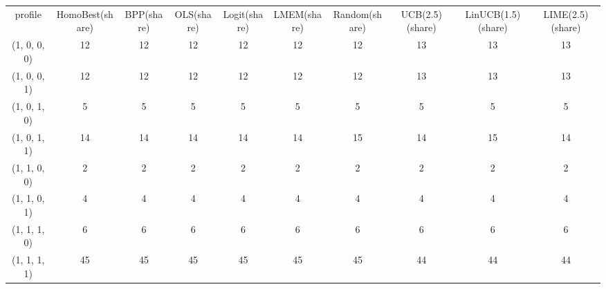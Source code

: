 \begin{tabular}{cccccccccc}
profile & HomoBest(share) & BPP(share) & OLS(share) & Logit(share) & LMEM(share) & Random(share) & UCB(2.5)(share) & LinUCB(1.5)(share) & LIME(2.5)(share)\\
(1, 0, 0, 0) & 12 & 12 & 12 & 12 & 12 & 12 & 13 & 13 & 13\\
(1, 0, 0, 1) & 12 & 12 & 12 & 12 & 12 & 12 & 13 & 13 & 13\\
(1, 0, 1, 0) & 5 & 5 & 5 & 5 & 5 & 5 & 5 & 5 & 5\\
(1, 0, 1, 1) & 14 & 14 & 14 & 14 & 14 & 15 & 14 & 15 & 14\\
(1, 1, 0, 0) & 2 & 2 & 2 & 2 & 2 & 2 & 2 & 2 & 2\\
(1, 1, 0, 1) & 4 & 4 & 4 & 4 & 4 & 4 & 4 & 4 & 4\\
(1, 1, 1, 0) & 6 & 6 & 6 & 6 & 6 & 6 & 6 & 6 & 6\\
(1, 1, 1, 1) & 45 & 45 & 45 & 45 & 45 & 45 & 44 & 44 & 44\\
\end{tabular}
